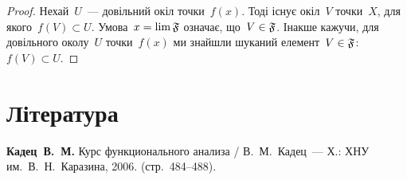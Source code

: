 \begin{proof}
    Нехай~$U$~--- довільний окіл точки~$f(x)$. Тоді існує окіл~$V$ точки~$X$, для якого~$f(V) \subset U$. Умова~$x = \lim \frak F$ означає, що~$V \in \frak F$. Інакше кажучи, для довільного околу~$U$ точки~$f(x)$ ми знайшли шуканий елемент~$V \in \frak F$: $f(V) \subset U$.
\end{proof}

\section{Література}

\begin{enumerate}[label={[\arabic*]}]
\item \textbf{Кадец~В.~М.}
Курс функционального анализа /
В.~М.~Кадец~---
Х.: ХНУ им.~В.~Н.~Каразина, 2006. (стр.~484--488).
\end{enumerate}
